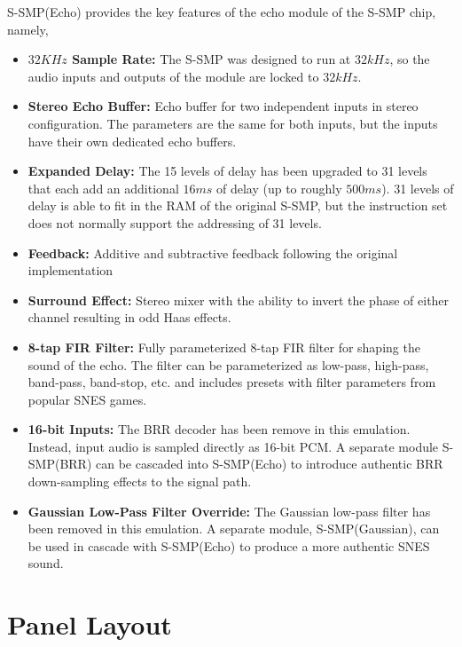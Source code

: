 \documentclass[12pt,letter]{article}
\begin{document}
S-SMP(Echo) provides the key features of the echo module of the S-SMP chip,
namely,
\begin{itemize}
  \item \textbf{$32KHz$ Sample Rate:} The S-SMP was designed to run at $32kHz$, so the audio inputs and outputs of the module are locked to $32kHz$.
  \item \textbf{Stereo Echo Buffer:} Echo buffer for two independent inputs in stereo configuration. The parameters are the same for both inputs, but the inputs have their own dedicated echo buffers.
  \item \textbf{Expanded Delay:} The 15 levels of delay has been upgraded to 31 levels that each add an additional $16ms$ of delay (up to roughly $500ms$). 31 levels of delay is able to fit in the RAM of the original S-SMP, but the instruction set does not normally support the addressing of 31 levels.
  \item \textbf{Feedback:} Additive and subtractive feedback following the original implementation
  \item \textbf{Surround Effect:} Stereo mixer with the ability to invert the phase of either channel resulting in odd Haas effects.
  \item \textbf{8-tap FIR Filter:} Fully parameterized 8-tap FIR filter for shaping the sound of the echo. The filter can be parameterized as low-pass, high-pass, band-pass, band-stop, etc. and includes presets with filter parameters from popular SNES games.
  \item \textbf{16-bit Inputs:} The BRR decoder has been remove in this emulation. Instead, input audio is sampled directly as 16-bit PCM. A separate module S-SMP(BRR) can be cascaded into S-SMP(Echo) to introduce authentic BRR down-sampling effects to the signal path.
  \item \textbf{Gaussian Low-Pass Filter Override:} The Gaussian low-pass filter has been removed in this emulation. A separate module, S-SMP(Gaussian), can be used in cascade with S-SMP(Echo) to produce a more authentic SNES sound.
\end{itemize}


\clearpage
\section{Panel Layout}
\end{document}
